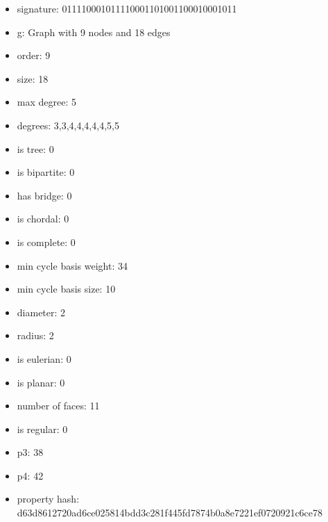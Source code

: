 \newpage
\begin{figure}
\end{figure}
\begin{itemize}
\item signature: 011110001011110001101001100010001011
\item g: Graph with 9 nodes and 18 edges
\item order: 9
\item size: 18
\item max degree: 5
\item degrees: 3,3,4,4,4,4,4,5,5
\item is tree: 0
\item is bipartite: 0
\item has bridge: 0
\item is chordal: 0
\item is complete: 0
\item min cycle basis weight: 34
\item min cycle basis size: 10
\item diameter: 2
\item radius: 2
\item is eulerian: 0
\item is planar: 0
\item number of faces: 11
\item is regular: 0
\item p3: 38
\item p4: 42
\item property hash: d63d8612720ad6ce025814bdd3c281f445fd7874b0a8e7221ef0720921c6ce78
\end{itemize}
